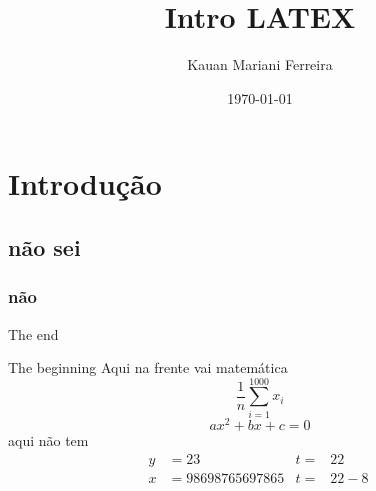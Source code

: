 \documentclass{article}
\title{Intro LATEX}
\author{Kauan Mariani Ferreira }
\date{\today}
\begin{document}
\maketitle

\newpage

\tableofcontents

\newpage

\section{Introdução}

\subsection{não sei}
\subsubsection{não}

The end
    
\hfill

The beginning
Aqui na frente vai matemática $$\frac{1}{n}\sum_{i=1}^{1000}x_{i}$$ $$ ax^2+bx+c=0 $$aqui não tem
\begin{align}
y &= 23 & t=&22 \\
x &=98698765697865 & t=&22-8\
\end{align}
\end{document}
